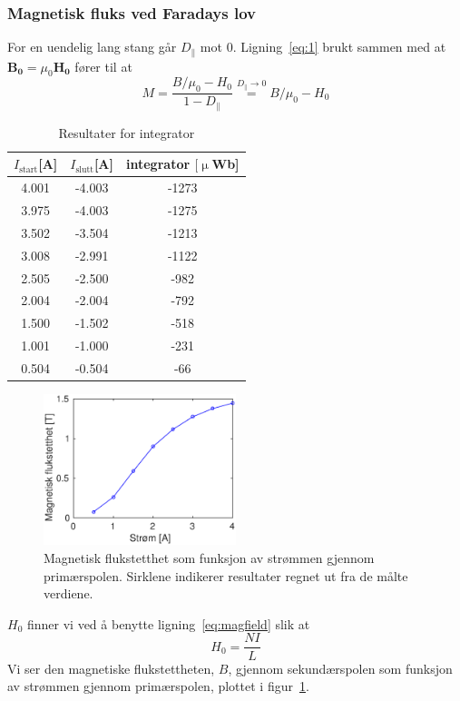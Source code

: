 \documentclass[a4paper,11pt, twocolumn]{article}
\begin{document}
\subsubsection{Magnetisk fluks ved Faradays lov}
For en uendelig lang stang går $D_\parallel$ mot 0. Ligning~\eqref{eq:1} brukt sammen med at $\mathbf{B_0} = \mu_0\mathbf{H_0}$ fører til at  
\begin{equation}
	M = \frac{B/\mu_0-H_0}{1-D_\parallel}\stackrel{D_\parallel\rightarrow 0}{=} B/\mu_0-H_0
	\label{eq:mag}
\end{equation}

\begin{table}
	\caption{Resultater for integrator}
	\label{tab:integrator}
	\centering
	\begin{tabular}{ccc}
		\toprule
		\toprule
		$I_\text{start}$[A] & $I_\text{slutt}$[A] & integrator $[\upmu$Wb]\\
		\toprule
		4.001&	-4.003&	-1273\\
		3.975&	-4.003&	-1275\\
		3.502&	-3.504&	-1213\\
		3.008&	-2.991&	-1122\\
		2.505&	-2.500&	-982 \\
		2.004&	-2.004&	-792 \\
		1.500&	-1.502&	-518 \\
		1.001&	-1.000&	-231 \\
		0.504&	-0.504&	-66  \\
		\toprule
	\end{tabular}
\end{table}
\begin{figure}[!ht]
	\centering
	\includegraphics[width = 0.5\textwidth]{matlab/bavi.eps}
	\caption{Magnetisk flukstetthet som funksjon av strømmen gjennom primærspolen. Sirklene indikerer resultater regnet ut fra de målte verdiene.}
	\label{fig:bavi}
\end{figure}
$H_0$ finner vi ved å benytte ligning~\eqref{eq:magfield} slik at
\begin{equation}
	H_0 = \frac{NI}{L}
	\label{eq:H0}
\end{equation}
Vi ser den magnetiske flukstettheten, $B$, gjennom sekundærspolen som funksjon av strømmen gjennom primærspolen, plottet i figur~\ref{fig:bavi}. 
\end{document}

